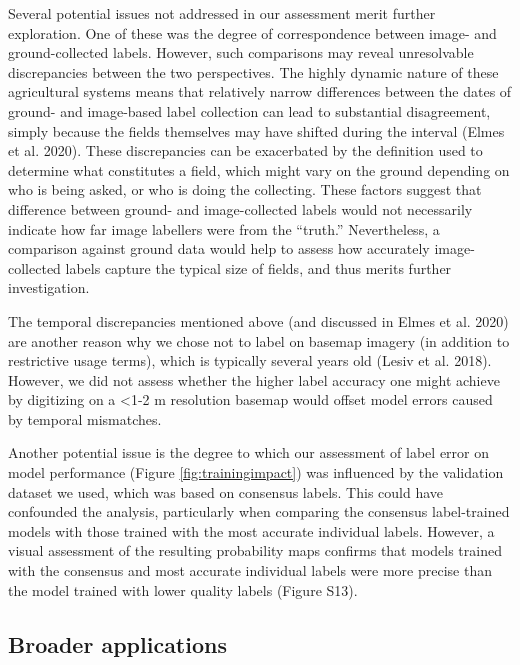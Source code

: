 \documentclass[11pt,a4paper]{article}
\begin{document}
Several potential issues not addressed in our assessment merit further
exploration. One of these was the degree of correspondence between
image- and ground-collected labels. However, such comparisons may reveal
unresolvable discrepancies between the two perspectives. The highly
dynamic nature of these agricultural systems means that relatively
narrow differences between the dates of ground- and image-based label
collection can lead to substantial disagreement, simply because the
fields themselves may have shifted during the interval (Elmes et al.
2020). These discrepancies can be exacerbated by the definition used to
determine what constitutes a field, which might vary on the ground
depending on who is being asked, or who is doing the collecting. These
factors suggest that difference between ground- and image-collected
labels would not necessarily indicate how far image labellers were from
the ``truth.'' Nevertheless, a comparison against ground data would help
to assess how accurately image-collected labels capture the typical size
of fields, and thus merits further investigation.

The temporal discrepancies mentioned above (and discussed in Elmes et
al. 2020) are another reason why we chose not to label on basemap
imagery (in addition to restrictive usage terms), which is typically
several years old (Lesiv et al. 2018). However, we did not assess
whether the higher label accuracy one might achieve by digitizing on a
\textless1-2 m resolution basemap would offset model errors caused by
temporal mismatches.

Another potential issue is the degree to which our assessment of label
error on model performance (Figure \ref{fig:trainingimpact}) was
influenced by the validation dataset we used, which was based on
consensus labels. This could have confounded the analysis, particularly
when comparing the consensus label-trained models with those trained
with the most accurate individual labels. However, a visual assessment
of the resulting probability maps confirms that models trained with the
consensus and most accurate individual labels were more precise than the
model trained with lower quality labels (Figure S13).

\hypertarget{broader-applications}{%
\subsection{Broader applications}\label{broader-applications}}
\end{document}
